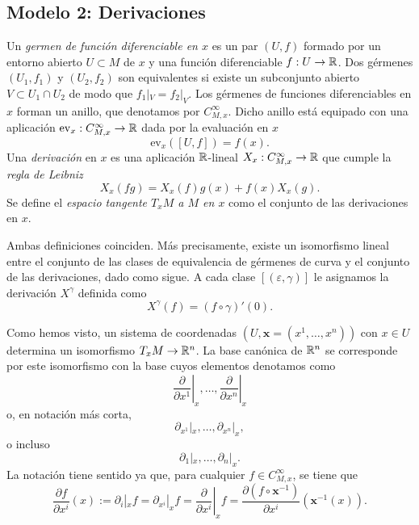 \documentclass[11pt,a4paper]{amsbook}
\theoremstyle{remark} \newtheorem{rmk}[subsection]{Observación}
\theoremstyle{definition} \newtheorem{defn}[subsection]{Definición}
\theoremstyle{definition} \newtheorem{ex}[subsection]{Ejemplo}
\theoremstyle{definition} \newtheorem{ej}[subsection]{Ejercicio}
\begin{document}
\subsection{Modelo 2: Derivaciones} Un \emph{germen de función diferenciable en $x$} es un par $(U,f)$ formado por un entorno abierto $U\subset M$ de $x$ y una función diferenciable $f:U\rightarrow \mathbb R$. Dos gérmenes $(U_1,f_1)$ y $(U_2,f_2)$ son equivalentes si existe un subconjunto abierto $V\subset U_1\cap U_2$ de modo que $f_1|_V=f_2|_V$. Los gérmenes de funciones diferenciables en $x$ forman un anillo, que denotamos por $C^\infty_{M,x}$. Dicho anillo está equipado con una aplicación $\mathrm{ev}_{x}:C^\infty_{M,x}\rightarrow \mathbb R$ dada por la evaluación en $x$
\begin{equation*}
\mathrm{ev}_x([U,f]) = f(x).
\end{equation*}
Una \emph{derivación} en $x$ es una aplicación $\mathbb R$-lineal $X_x: C^\infty_{M,x} \rightarrow \mathbb R$ que cumple la \emph{regla de Leibniz}
\begin{equation*}
X_x(fg) = X_x(f) g(x) + f(x) X_x(g).
\end{equation*}
Se define el \emph{espacio tangente $T_xM$ a $M$ en $x$} como el conjunto de las derivaciones en $x$.

Ambas definiciones coinciden. Más precisamente, existe un isomorfismo lineal entre el conjunto de las clases de equivalencia de gérmenes de curva y el conjunto de las derivaciones, dado como sigue. A cada clase $[(\varepsilon,\gamma)]$ le asignamos la derivación $X^\gamma$ definida como
\begin{equation*}
X^\gamma(f) = (f\circ \gamma)'(0).
\end{equation*}

Como hemos visto, un sistema de coordenadas $(U,\bm{x}=(x^1,\dots,x^n))$ con $x\in U$ determina un isomorfismo $T_xM \rightarrow \mathbb R^n$. La base canónica de $\mathbb R^n$ se corresponde por este isomorfismo con la base cuyos elementos denotamos como
\begin{equation*}
\left. \frac{\partial}{\partial x^1}\right|_x, \dots, \left. \frac{\partial}{\partial x^n}\right|_x
\end{equation*}
o, en notación más corta,
\begin{equation*}
  \partial_{x^1}|_x,\dots, \partial_{x^n}|_x,
\end{equation*}
o incluso
\begin{equation*}
  \partial_{1}|_x,\dots, \partial_{n}|_x.
\end{equation*}
La notación tiene sentido ya que, para cualquier $f\in C^\infty_{M,x}$, se tiene que
\begin{equation*}
\frac{\partial f}{\partial x^i}(x):=\partial_{i}|_x f=\partial_{x^i}|_x f = \left. \frac{\partial}{\partial x^i} \right|_x f = \frac{\partial (f \circ \bm{x}^{-1})}{\partial x^i} (\bm{x}^{-1}(x)).
\end{equation*}
\end{document}

